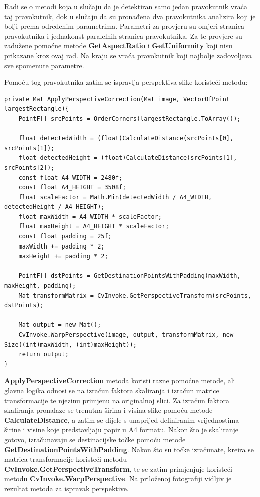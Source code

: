 \documentclass{foi}
\begin{document}
Radi se o metodi koja u slučaju da je detektiran samo jedan pravokutnik vraća taj pravokutnik, dok u slučaju da su pronađena dva pravokutnika analizira koji je bolji prema određenim parametrima. Parametri za provjeru su omjeri stranica pravokutnika i jednakonst paralelnih stranica pravokutnika. Za te provjere su zadužene pomoćne metode \textbf{GetAspectRatio} i \textbf{GetUniformity} koji nisu prikazane kroz ovaj rad. Na kraju se vraća pravokutnik koji najbolje zadovoljava sve spomenute parametre.

\pagebreak
Pomoću tog pravokutnika zatim se ispravlja perspektiva slike koristeći metodu:
\begin{lstlisting}[caption={Metoda za odabir najboljeg pravokutnika}]
private Mat ApplyPerspectiveCorrection(Mat image, VectorOfPoint largestRectangle){
    PointF[] srcPoints = OrderCorners(largestRectangle.ToArray());

    float detectedWidth = (float)CalculateDistance(srcPoints[0], srcPoints[1]);
    float detectedHeight = (float)CalculateDistance(srcPoints[1], srcPoints[2]);
    const float A4_WIDTH = 2480f;
    const float A4_HEIGHT = 3508f;
    float scaleFactor = Math.Min(detectedWidth / A4_WIDTH, detectedHeight / A4_HEIGHT);
    float maxWidth = A4_WIDTH * scaleFactor;
    float maxHeight = A4_HEIGHT * scaleFactor;
    const float padding = 25f;
    maxWidth += padding * 2;
    maxHeight += padding * 2;

    PointF[] dstPoints = GetDestinationPointsWithPadding(maxWidth, maxHeight, padding);
    Mat transformMatrix = CvInvoke.GetPerspectiveTransform(srcPoints, dstPoints);

    Mat output = new Mat();
    CvInvoke.WarpPerspective(image, output, transformMatrix, new Size((int)maxWidth, (int)maxHeight));
    return output;
}
\end{lstlisting}

\textbf{ApplyPerspectiveCorrection} metoda koristi razne pomoćne metode, ali glavna logika odnosi se na izračun faktora skaliranja i izračun matrice transformacije te njezinu primjenu na originalnoj slici. Za izračun faktora skaliranja pronalaze se trenutna širina i visina slike pomoću metode \textbf{CalculateDistance}, a zatim se dijele s unaprijed definiranim vrijednostima širine i visine koje predstavljaju papir u A4 formatu. Nakon što je skaliranje gotovo, izračunavaju se destinacijske točke pomoću metode \textbf{GetDestinationPointsWithPadding}. Nakon što su točke izračunate, kreira se matrica transformacije koristeći metodu \textbf{CvInvoke.GetPerspectiveTransform}, te se zatim primjenjuje koristeći metodu \textbf{CvInvoke.WarpPerspective}. Na priloženoj fotografiji vidljiv je rezultat metoda za ispravak perspektive.
\end{document}
